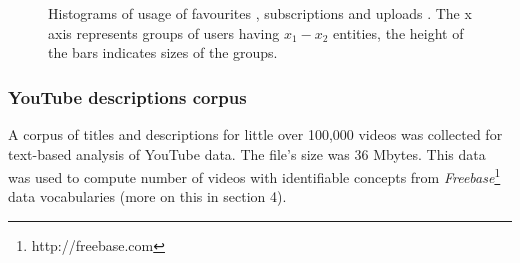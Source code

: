 \begin{figure}[htb]
  \centering
  \label{fig:subfigureExample}
  \caption{Histograms of usage of favourites , subscriptions
   and uploads . The x axis represents groups of
  users having $x_1-x_2$ entities, the height of the bars indicates sizes of the
  groups.}
\end{figure}


\subsubsection{YouTube descriptions corpus}

A corpus of titles and descriptions for little over 100,000 videos was collected
for text-based analysis of YouTube data. The file's size was 36 Mbytes. This
data was used to compute number of videos with identifiable concepts from
\textit{Freebase}\footnote{http://freebase.com} data vocabularies (more on this in section 4).

